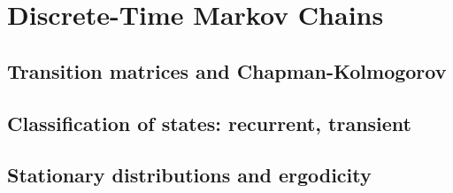 
\section{Discrete-Time Markov Chains}

\subsection{Transition matrices and Chapman-Kolmogorov}


\subsection{Classification of states: recurrent, transient}


\subsection{Stationary distributions and ergodicity}

